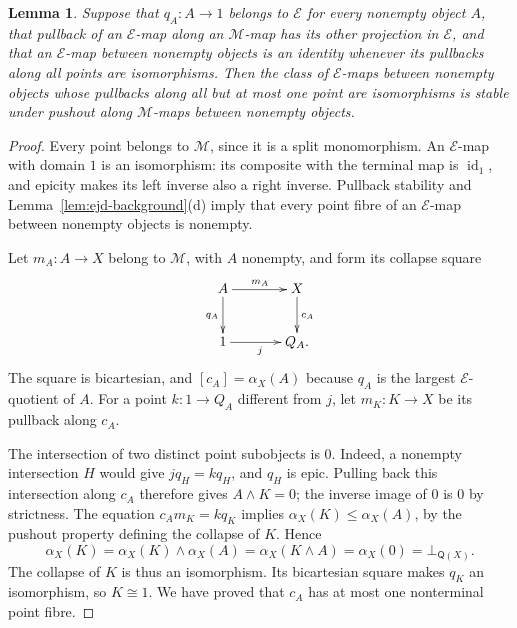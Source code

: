 \documentclass[11pt,a4paper]{article}
\theoremstyle{plain}
\newtheorem{lemma}[theorem]{Lemma}
\theoremstyle{definition}
\theoremstyle{remark}
\newcommand{\id}{\operatorname{id}}
\begin{document}
\begin{lemma}\label{lem:ejd-single-fibres}
Suppose that $q_A:A\to1$ belongs to $\mathcal E$ for every
nonempty object $A$,
that pullback of an $\mathcal E$-map along an $\mathcal M$-map
has its other projection in $\mathcal E$, and that an
$\mathcal E$-map between nonempty objects is an identity whenever
its pullbacks along all points are isomorphisms. Then the class
of $\mathcal E$-maps between nonempty objects whose pullbacks
along all but at most one point are isomorphisms is stable under
pushout along $\mathcal M$-maps between nonempty objects.
\end{lemma}
\begin{proof}
Every point belongs to $\mathcal M$, since it is a split
monomorphism. An $\mathcal E$-map with domain $1$ is an
isomorphism: its composite with the terminal map is $\id_1$,
and epicity makes its left inverse also a right inverse.
Pullback stability and Lemma~\ref{lem:ejd-background}(d) imply
that every point fibre of an $\mathcal E$-map between nonempty
objects is nonempty.

Let $m_A:A\to X$ belong to $\mathcal M$, with $A$ nonempty,
and form its collapse square
\[
\xymatrix@C=3.5em@R=2.4em{
A\ar[r]^{m_A}\ar[d]_{q_A}&X\ar[d]^{c_A}\\
1\ar[r]_j&Q_A.
}
\]
The square is bicartesian, and $[c_A]=\alpha_X(A)$ because
$q_A$ is the largest $\mathcal E$-quotient of $A$.
For a point $k:1\to Q_A$ different from $j$, let
$m_K:K\to X$ be its pullback along $c_A$.

The intersection of two distinct point subobjects is $0$.
Indeed, a nonempty intersection $H$ would give
$j q_H=k q_H$, and $q_H$ is epic. Pulling back this intersection
along $c_A$ therefore gives $A\wedge K=0$; the inverse image
of $0$ is $0$ by strictness. The equation
$c_A m_K=kq_K$ implies $\alpha_X(K)\le\alpha_X(A)$, by the
pushout property defining the collapse of $K$. Hence
\[
\alpha_X(K)
=\alpha_X(K)\wedge\alpha_X(A)
=\alpha_X(K\wedge A)
=\alpha_X(0)
=\bot_{\mathsf Q(X)}.
\]
The collapse of $K$ is thus an isomorphism. Its bicartesian
square makes $q_K$ an isomorphism, so $K\cong1$. We have
proved that $c_A$ has at most one nonterminal point fibre.


\end{proof}
\end{document}

